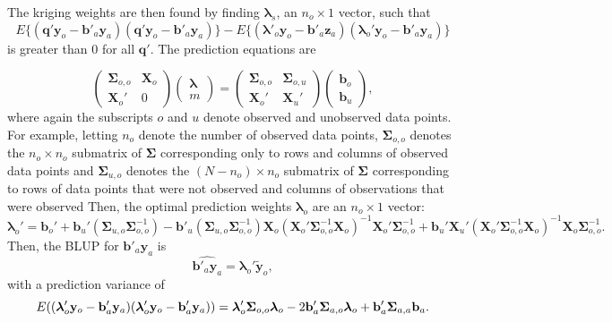 \documentclass[]{interact}
\theoremstyle{plain}%
\theoremstyle{definition}
\theoremstyle{remark}
\begin{document}
The kriging weights are then found by finding \(\bm{\lambda}_s\), an
\(n_o \times 1\) vector, such that \mbox{} \begin{equation}
E\{(\mathbf{q'}\mathbf{y}_o - \mathbf{b'}_a \mathbf{y}_a)(\mathbf{q'}\mathbf{y}_o - \mathbf{b'}_a \mathbf{y}_a)\} - E\{(\bm{\lambda'}_o\mathbf{y}_o - \mathbf{b'}_a \mathbf{z}_a)(\bm{\lambda}_o'\mathbf{y}_o - \mathbf{b'}_a \mathbf{y}_a)\}
\end{equation} \noindent is greater than 0 for all \(\mathbf{q'}\). The
prediction equations are

\begin{equation}
\begin{pmatrix}
\bm{\Sigma}_{o, o} & \mathbf{X}_o \\
\mathbf{X}_o' & 0
\end{pmatrix} 
\begin{pmatrix}
\bm{\lambda} \\
m
\end{pmatrix} = 
\begin{pmatrix}
\bm{\Sigma}_{o, o} & \bm{\Sigma}_{o, u} \\
\mathbf{X}_{o}' & \mathbf{X}_{u}'
\end{pmatrix} 
\begin{pmatrix}
\mathbf{b}_{o} \\
\mathbf{b}_{u}
\end{pmatrix},
\end{equation} \noindent where again the subscripts \(o\) and \(u\)
denote observed and unobserved data points. For example, letting \(n_o\)
denote the number of observed data points, \(\bm{\Sigma}_{o, o}\)
denotes the \(n_o \times n_o\) submatrix of \(\bm{\Sigma}\)
corresponding only to rows and columns of observed data points and
\(\bm{\Sigma}_{u, o}\) denotes the \((N - n_o) \times n_o\) submatrix of
\(\bm{\Sigma}\) corresponding to rows of data points that were not
observed and columns of observations that were observed Then, the
optimal prediction weights \(\bm{\lambda}_o\) are an \(n_o \times 1\)
vector: \mbox{} \begin{equation}
\bm{\lambda}_o' = \mathbf{b}_{o}' + \mathbf{b}_{u}' (\bm{\Sigma}_{u, o}\bm{\Sigma}_{o, o}^{-1}) - \mathbf{b}'_{u}(\bm{\Sigma}_{u, o} \bm{\Sigma}_{o, o}^{-1})\mathbf{X}_o(\mathbf{X}_o'\bm{\Sigma}_{o, o}^{-1}\mathbf{X}_o)^{-1}\mathbf{X}_o'\bm{\Sigma}_{o, o}^{-1} + \mathbf{b}_{u}' \mathbf{X}_{u}'(\mathbf{X}_o'\bm{\Sigma}_{o, o}^{-1}\mathbf{X}_o)^{-1}\mathbf{X}_o \bm{\Sigma}_{o, o}^{-1}.
\end{equation} \noindent Then, the BLUP for
\(\mathbf{b}'_a \mathbf{y}_a\) is \mbox{} \begin{equation}
\hat{\mathbf{b}'_a \mathbf{y}_a} = \bm{\lambda}_o' \mathbf{\tilde{y}}_o,
\end{equation} \noindent with a prediction variance of \mbox{}
\begin{equation}
E((\bm{\lambda}_o'\mathbf{y}_o - \mathbf{b}_a'\mathbf{y}_a)(\bm{\lambda}_o'\mathbf{y}_o - \mathbf{b}_a'\mathbf{y}_a)) = \\
\bm{\lambda}_o'\bm{\Sigma}_{o, o}\bm{\lambda}_o - 2 \mathbf{b}_a' \bm{\Sigma}_{a, o} \bm{\lambda}_o + \mathbf{b}_a' \bm{\Sigma}_{a, a} \mathbf{b}_a.
\end{equation}
\end{document}
